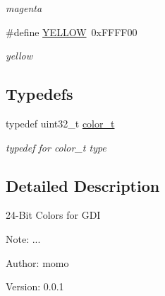 \begin{CompactItemize}
\begin{CompactList}\small\item\em magenta \item\end{CompactList}\item 
\hypertarget{group__hgdi__colors24_gbf681265909adf3d3e8116c93c0ba179}{
\#define \hyperlink{group__hgdi__colors24_gbf681265909adf3d3e8116c93c0ba179}{YELLOW}~0xFFFF00}
\label{group__hgdi__colors24_gbf681265909adf3d3e8116c93c0ba179}

\begin{CompactList}\small\item\em yellow \item\end{CompactList}\end{CompactItemize}
\subsection*{Typedefs}
\begin{CompactItemize}
\item 
\hypertarget{group__hgdi__colors24_g8795f711ef385216d09794142679adf1}{
typedef uint32\_\-t \hyperlink{group__hgdi__colors24_g8795f711ef385216d09794142679adf1}{color\_\-t}}
\label{group__hgdi__colors24_g8795f711ef385216d09794142679adf1}

\begin{CompactList}\small\item\em typedef for color\_\-t type \item\end{CompactList}\end{CompactItemize}


\subsection{Detailed Description}
24-Bit Colors for GDI 

\begin{Desc}
\item[Note:]... \end{Desc}
\begin{Desc}
\item[Author:]momo \end{Desc}
\begin{Desc}
\item[Version:]0.0.1 \end{Desc}
